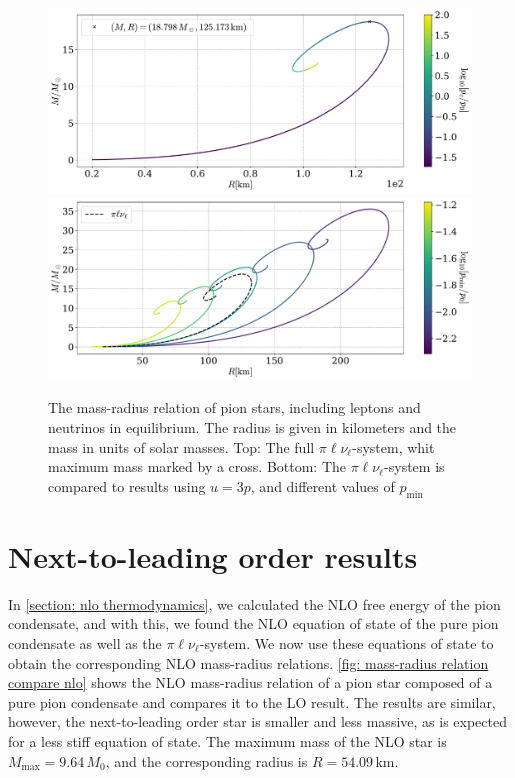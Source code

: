 \begin{figure}[H]
    \centering
    \includegraphics[width=.8\textwidth]{../scripts/figurer/pion_star/mass_radius_neutrino.pdf}
    \includegraphics[width=.8\textwidth]{../scripts/figurer/pion_star/mass_radius_light.pdf}
    \caption{
        The mass-radius relation of pion stars, including leptons and neutrinos in equilibrium.
        The radius is given in kilometers and the mass in units of solar masses.
        Top: The full $\pi\ell\nu_\ell$-system, whit maximum mass marked by a cross.
        Bottom: The $\pi\ell\nu_\ell$-system is compared to results using $u=3p$, and different values of $p_\text{min}$
        }
        \label{fig: mass radius neutrino}
\end{figure}



\section{Next-to-leading order results}

In \autoref{section: nlo thermodynamics}, we calculated the NLO free energy of the pion condensate, and with this, we found the NLO equation of state of the pure pion condensate as well as the $\pi\ell\nu_\ell$-system.
We now use these equations of state to obtain the corresponding NLO mass-radius relations.
\autoref{fig: mass-radius relation compare nlo} shows the NLO mass-radius relation of a pion star composed of a pure pion condensate and compares it to the LO result.
The results are similar, however, the next-to-leading order star is smaller and less massive, as is expected for a less stiff equation of state.
The maximum mass of the NLO star is $M_\text{max} = 9.64\, M_0$, and the corresponding radius is $R = 54.09\,\text{km}$.

